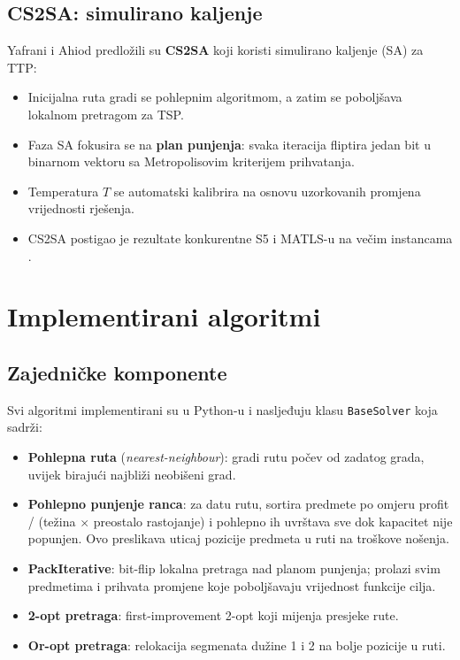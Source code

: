 \documentclass[12pt,a4paper]{article}
\begin{document}
\subsection{CS2SA: simulirano kaljenje}

Yafrani i Ahiod \cite{yafrani2016} predlo\v{z}ili su \textbf{CS2SA} koji koristi simulirano kaljenje (SA) za TTP:
\begin{itemize}
    \item Inicijalna ruta gradi se pohlepnim algoritmom, a zatim se pobolj\v{s}ava lokalnom pretragom za TSP.
    \item Faza SA fokusira se na \textbf{plan punjenja}: svaka iteracija fliptira jedan bit u binarnom vektoru sa Metropolisovim kriterijem prihvatanja.
    \item Temperatura $T$ se automatski kalibrira na osnovu uzorkovanih promjena vrijednosti rje\v{s}enja.
    \item CS2SA postigao je rezultate konkurentne S5 i MATLS-u na ve\v{c}im instancama \cite{wagner_selection}.
\end{itemize}

\section{Implementirani algoritmi}

\subsection{Zajedni\v{c}ke komponente}

Svi algoritmi implementirani su u Python-u i nasljeđuju klasu \texttt{BaseSolver} koja sadr\v{z}i:
\begin{itemize}
    \item \textbf{Pohlepna ruta} (\textit{nearest-neighbour}): gradi rutu po\v{c}ev od zadatog grada, uvijek biraju\'{c}i najbli\v{z}i neobi\v{s}eni grad.
    \item \textbf{Pohlepno punjenje ranca}: za datu rutu, sortira predmete po omjeru profit / (te\v{z}ina $\times$ preostalo rastojanje) i pohlepno ih uvrštava sve dok kapacitet nije popunjen. Ovo preslikava uticaj pozicije predmeta u ruti na troškove no\v{s}enja.
    \item \textbf{PackIterative}: bit-flip lokalna pretraga nad planom punjenja; prolazi svim predmetima i prihvata promjene koje pobolj\v{s}avaju vrijednost funkcije cilja.
    \item \textbf{2-opt pretraga}: first-improvement 2-opt koji mijenja presjeke rute.
    \item \textbf{Or-opt pretraga}: relokacija segmenata du\v{z}ine 1 i 2 na bolje pozicije u ruti.
\end{itemize}
\end{document}

